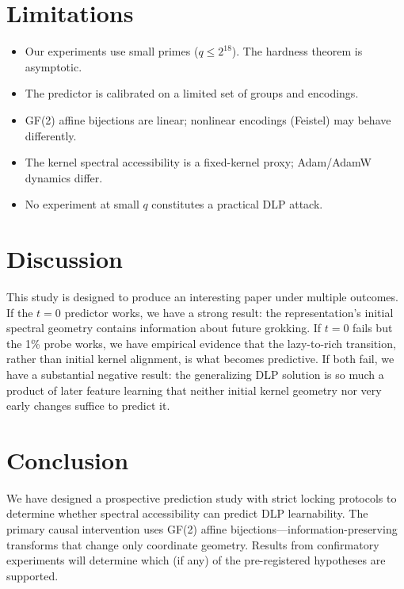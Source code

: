 \documentclass[11pt]{article}
\begin{document}
\section{Limitations}\label{sec:limitations}

\begin{itemize}[leftmargin=*]
    \item Our experiments use small primes ($q \leq 2^{18}$). The hardness theorem is asymptotic.
    \item The predictor is calibrated on a limited set of groups and encodings.
    \item GF(2) affine bijections are linear; nonlinear encodings (Feistel) may behave differently.
    \item The kernel spectral accessibility is a fixed-kernel proxy; Adam/AdamW dynamics differ.
    \item No experiment at small $q$ constitutes a practical DLP attack.
\end{itemize}

\section{Discussion}\label{sec:discussion}

This study is designed to produce an interesting paper under multiple outcomes. If the $t=0$ predictor works, we have a strong result: the representation's initial spectral geometry contains information about future grokking. If $t=0$ fails but the 1\% probe works, we have empirical evidence that the lazy-to-rich transition, rather than initial kernel alignment, is what becomes predictive. If both fail, we have a substantial negative result: the generalizing DLP solution is so much a product of later feature learning that neither initial kernel geometry nor very early changes suffice to predict it.

\section{Conclusion}\label{sec:conclusion}

We have designed a prospective prediction study with strict locking protocols to determine whether spectral accessibility can predict DLP learnability. The primary causal intervention uses GF(2) affine bijections---information-preserving transforms that change only coordinate geometry. Results from confirmatory experiments will determine which (if any) of the pre-registered hypotheses are supported.
\end{document}
